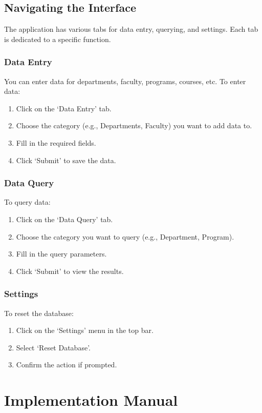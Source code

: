 \documentclass{article}
\begin{document}
		\subsection{Navigating the Interface}
		The application has various tabs for data entry, querying, and settings. Each tab is dedicated to a specific function.

		\subsubsection{Data Entry}
		You can enter data for departments, faculty, programs, courses, etc. To enter data:
		\begin{enumerate}
		    \item Click on the ‘Data Entry’ tab.
		    \item Choose the category (e.g., Departments, Faculty) you want to add data to.
		    \item Fill in the required fields.
		    \item Click ‘Submit’ to save the data.
		\end{enumerate}

		\subsubsection{Data Query}
		To query data:
		\begin{enumerate}
		    \item Click on the ‘Data Query’ tab.
		    \item Choose the category you want to query (e.g., Department, Program).
		    \item Fill in the query parameters.
		    \item Click ‘Submit’ to view the results.
		\end{enumerate}

		\subsubsection{Settings}
		To reset the database:
		\begin{enumerate}
		    \item Click on the ‘Settings’ menu in the top bar.
		    \item Select ‘Reset Database’.
		    \item Confirm the action if prompted.
		\end{enumerate}

		\section*{Implementation Manual}
\end{document}
